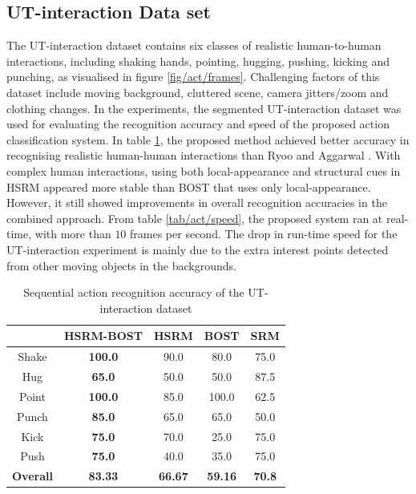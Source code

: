 \subsection{UT-interaction Data set}
The UT-interaction dataset contains six classes of realistic human-to-human interactions, including shaking hands, pointing, hugging, pushing, kicking and punching, as visualised in figure \ref{fig/act/frames}. 
Challenging factors of this dataset include moving background, cluttered scene, camera jitters/zoom and clothing changes. 
In the experiments, the segmented UT-interaction dataset was used for evaluating the recognition accuracy and speed of the proposed action classification system. 
In table \ref{tab/act/utcompare}, the proposed method achieved better accuracy in recognising realistic human-human interactions than Ryoo and Aggarwal \cite{Ryoo2009}. 
With complex human interactions, using both local-appearance and structural cues in HSRM appeared more stable than BOST that uses only local-appearance. 
However, it still showed improvements in overall recognition accuracies in the combined approach. 
From table \ref{tab/act/speed}, the proposed system ran at real-time, with more than $10$ frames per second. 
The drop in run-time speed for the UT-interaction experiment is mainly due to the extra interest points detected from other moving objects in the backgrounds.

\begin{table}
	\centering
	\begin{tabular}{|c|c|c|c|c|}
		\hline 
		\backslashbox{\textbf{Action}}{\textbf{Method}} & \textbf{HSRM-BOST} & \textbf{HSRM} & \textbf{BOST} & \textbf{SRM}\cite{Ryoo2009} \\
		\hline 
		Shake & \textbf{\color{blue}100.0} & 90.0 & 80.0 & 75.0 \\ 
		Hug & \textbf{\color{blue}65.0} & 50.0 & 50.0 & 87.5 \\ 
		Point & \textbf{\color{blue}100.0} & 85.0 & 100.0 & 62.5 \\ 
		Punch & \textbf{\color{blue}85.0} & 65.0 & 65.0 & 50.0 \\ 
		Kick & \textbf{\color{blue}75.0} & 70.0 & 25.0 & 75.0 \\ 
		Push & \textbf{\color{blue}75.0} & 40.0 & 35.0 & 75.0 \\ 
		\hline 	
		\textbf{ Overall } & \textbf{\color{blue}83.33} & \textbf{66.67} & \textbf{59.16} & \textbf{70.8} \\ 
		\hline 
	\end{tabular}
	\caption{Sequential action recognition accuracy of the UT-interaction dataset}
	\label{tab/act/utcompare}
\end{table}

